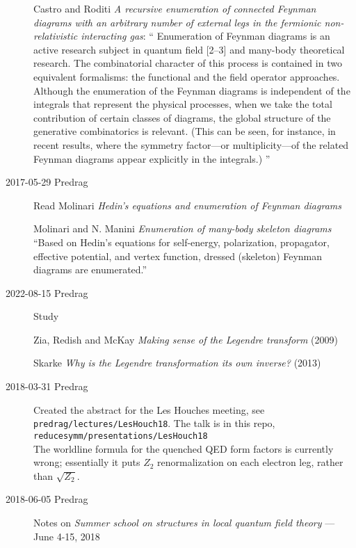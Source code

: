 \begin{description}
Castro and Roditi {\em A recursive enumeration of connected
{Feynman} diagrams with an arbitrary number of external legs in the
fermionic non-relativistic interacting gas}: ``
Enumeration of Feynman diagrams is an active research subject in quantum
field [2–3] and many-body theoretical
research. The combinatorial character of
this process is contained in two equivalent formalisms: the functional
and the field operator approaches. Although the enumeration of the
Feynman diagrams is independent of the integrals that represent the
physical processes, when we take the total contribution of certain
classes of diagrams, the global structure of the generative combinatorics
is relevant. (This can be seen, for instance, in recent
results, where the symmetry factor—or multiplicity—of the
related Feynman diagrams appear explicitly in the integrals.)
''

\item[2017-05-29 Predrag] Read
Molinari
{\em Hedin's equations and enumeration of {Feynman} diagrams}

Molinari and N. Manini
{\em Enumeration of many-body skeleton diagrams}
``Based on Hedin's equations for self-energy, polarization, propagator,
effective potential, and vertex function, dressed (skeleton) Feynman
diagrams are enumerated.''

\item[2022-08-15 Predrag] Study

Zia, Redish and McKay
{\em Making sense of the {Legendre} transform} (2009)

Skarke
{\em Why is the {Legendre} transformation its own inverse?}
(2013)

\item[2018-03-31 Predrag] Created the abstract for the Les Houches meeting, see\\
\texttt{predrag/lectures/LesHouch18}.
The talk is in this repo, \\
\texttt{reducesymm/presentations/LesHouch18} \\ %
The worldline formula for the quenched QED form factors is currently
wrong; essentially it puts $Z_2$ renormalization on each electron leg,
rather than $\sqrt{Z_2}$.

\item[2018-06-05 Predrag]
Notes on
{\em Summer school on structures in local quantum field theory}
 — June 4-15, 2018


\end{description}
